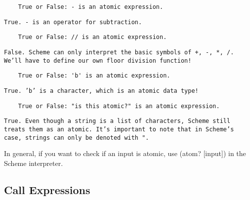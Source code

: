 \begin{lstlisting}
    True or False: - is an atomic expression.
\end{lstlisting}
\begin{solution}[0.25in]
    \texttt{True. - is an operator for subtraction.}
\end{solution}

\begin{lstlisting}
    True or False: // is an atomic expression.
\end{lstlisting}
\begin{solution}[0.25in]
    \texttt{False. Scheme can only interpret the basic symbols of +, -, *, /. We'll have to define our own floor division function!}
\end{solution}

\begin{lstlisting}
    True or False: 'b' is an atomic expression.
\end{lstlisting}
\begin{solution}[0.25in]
    \texttt{True. 'b' is a character, which is an atomic data type!}
\end{solution}

\begin{lstlisting}
    True or False: "is this atomic?" is an atomic expression.
\end{lstlisting}
\begin{solution}[0.25in]
    \texttt{True. Even though a string is a list of characters, Scheme still treats them as an atomic. It's important to note that in Scheme's case, strings can only be denoted with ".}
\end{solution}

In general, if you want to check if an input is atomic, use (atom? [input]) in the Scheme interpreter.

\subsection{Call Expressions}

